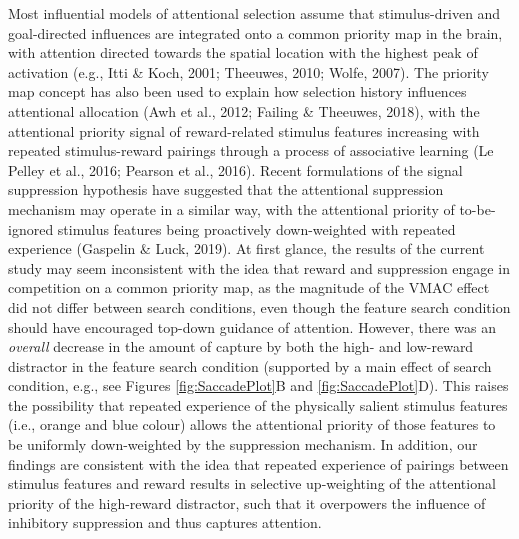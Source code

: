 \documentclass[man, a4paper, noextraspace, 11pt,floatsintext]{apa6}
\begin{document}
Most influential models of attentional selection assume that
stimulus-driven and goal-directed influences are integrated onto a
common priority map in the brain, with attention directed towards the
spatial location with the highest peak of activation (e.g., Itti \&
Koch, 2001; Theeuwes, 2010; Wolfe, 2007). The priority map concept has
also been used to explain how selection history influences attentional
allocation (Awh et al., 2012; Failing \& Theeuwes, 2018), with the
attentional priority signal of reward-related stimulus features
increasing with repeated stimulus-reward pairings through a process of
associative learning (Le Pelley et al., 2016; Pearson et al., 2016).
Recent formulations of the signal suppression hypothesis have suggested
that the attentional suppression mechanism may operate in a similar way,
with the attentional priority of to-be-ignored stimulus features being
proactively down-weighted with repeated experience (Gaspelin \& Luck,
2019). At first glance, the results of the current study may seem
inconsistent with the idea that reward and suppression engage in
competition on a common priority map, as the magnitude of the VMAC
effect did not differ between search conditions, even though the feature
search condition should have encouraged top-down guidance of attention.
However, there was an \emph{overall} decrease in the amount of capture
by both the high- and low-reward distractor in the feature search
condition (supported by a main effect of search condition, e.g., see
Figures \ref{fig:SaccadePlot}B and \ref{fig:SaccadePlot}D). This raises
the possibility that repeated experience of the physically salient
stimulus features (i.e., orange and blue colour) allows the attentional
priority of those features to be uniformly down-weighted by the
suppression mechanism. In addition, our findings are consistent with the
idea that repeated experience of pairings between stimulus features and
reward results in selective up-weighting of the attentional priority of
the high-reward distractor, such that it overpowers the influence of
inhibitory suppression and thus captures attention.
\end{document}
